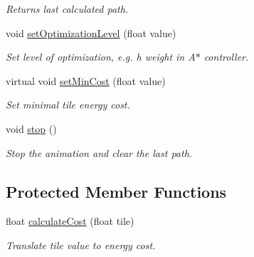 \begin{DoxyCompactItemize}
\begin{DoxyCompactList}\small\item\em Returns last calculated path. \end{DoxyCompactList}\item 
void \hyperlink{classWorldAbstractController_ad7c83b4de6ee365ef241c0755faa6e0d}{set\+Optimization\+Level} (float value)
\begin{DoxyCompactList}\small\item\em Set level of optimization, e.\+g. h weight in A$\ast$ controller. \end{DoxyCompactList}\item 
virtual void \hyperlink{classWorldAbstractController_a7e70e58d1a22f825034c7d583bf8d662}{set\+Min\+Cost} (float value)
\begin{DoxyCompactList}\small\item\em Set minimal tile energy cost. \end{DoxyCompactList}\item 
void \hyperlink{classWorldAbstractController_a803d78a89d8aa8644e6755d86cb55a5f}{stop} ()\hypertarget{classWorldAbstractController_a803d78a89d8aa8644e6755d86cb55a5f}{}\label{classWorldAbstractController_a803d78a89d8aa8644e6755d86cb55a5f}

\begin{DoxyCompactList}\small\item\em Stop the animation and clear the last path. \end{DoxyCompactList}\end{DoxyCompactItemize}
\subsection*{Protected Member Functions}
\begin{DoxyCompactItemize}
\item 
float \hyperlink{classWorldAbstractController_a556c8e2b55b017f5e837db2b58d3553e}{calculate\+Cost} (float tile)
\begin{DoxyCompactList}\small\item\em Translate tile value to energy cost. \end{DoxyCompactList}\end{DoxyCompactItemize}
